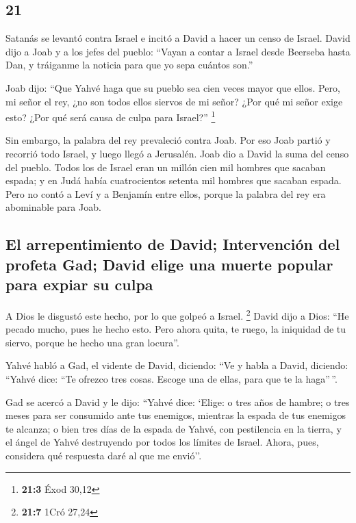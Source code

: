 \begin{paracol}{2}
\hypertarget{section-40}{%
\section{21}\label{section-40}}

 Satanás se levantó contra Israel e incitó a David a hacer
un censo de Israel.  David dijo a Joab y a los jefes del
pueblo: ``Vayan a contar a Israel desde Beerseba hasta Dan, y tráiganme
la noticia para que yo sepa cuántos son.''

 Joab dijo: ``Que Yahvé haga que su pueblo sea cien veces
mayor que ellos. Pero, mi señor el rey, ¿no son todos ellos siervos de
mi señor? ¿Por qué mi señor exige esto? ¿Por qué será causa de culpa
para Israel?'' \footnote{\textbf{21:3} Éxod 30,12}

 Sin embargo, la palabra del rey prevaleció contra Joab.
Por eso Joab partió y recorrió todo Israel, y luego llegó a Jerusalén.
 Joab dio a David la suma del censo del pueblo. Todos los
de Israel eran un millón cien mil hombres que sacaban espada; y en Judá
había cuatrocientos setenta mil hombres que sacaban espada.
 Pero no contó a Leví y a Benjamín entre ellos, porque la
palabra del rey era abominable para Joab.

\hypertarget{el-arrepentimiento-de-david-intervenciuxf3n-del-profeta-gad-david-elige-una-muerte-popular-para-expiar-su-culpa}{%
\subsection{El arrepentimiento de David; Intervención del profeta Gad;
David elige una muerte popular para expiar su
culpa}\label{el-arrepentimiento-de-david-intervenciuxf3n-del-profeta-gad-david-elige-una-muerte-popular-para-expiar-su-culpa}}

 A Dios le disgustó este hecho, por lo que golpeó a
Israel. \footnote{\textbf{21:7} 1Cró 27,24}  David dijo a
Dios: ``He pecado mucho, pues he hecho esto. Pero ahora quita, te ruego,
la iniquidad de tu siervo, porque he hecho una gran locura''.

 Yahvé habló a Gad, el vidente de David, diciendo:
 ``Ve y habla a David, diciendo: ``Yahvé dice: ``Te
ofrezco tres cosas. Escoge una de ellas, para que te la haga''\,''.

 Gad se acercó a David y le dijo: ``Yahvé dice: `Elige:
 o tres años de hambre; o tres meses para ser consumido
ante tus enemigos, mientras la espada de tus enemigos te alcanza; o bien
tres días de la espada de Yahvé, con pestilencia en la tierra, y el
ángel de Yahvé destruyendo por todos los límites de Israel. Ahora, pues,
considera qué respuesta daré al que me envió''.


\end{paracol}
